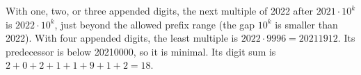 With one, two, or three appended digits, the next multiple of 2022 after $2021\cdot10^k$ is $2022\cdot10^k$, just beyond the allowed prefix range (the gap $10^k$ is smaller than 2022). With four appended digits, the least multiple is $2022\cdot9996=20211912$. Its predecessor is below 20210000, so it is minimal. Its digit sum is $2+0+2+1+1+9+1+2=\boxed{18}$.
